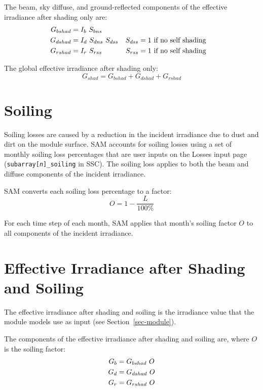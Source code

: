 \documentclass[12pt,letterpaper]{article}
\begin{document}
The beam, sky diffuse, and ground-reflected components of the effective irradiance after shading only are:
\begin{align}
G_{bshad} &= I_b~S_{bns}\notag\\
G_{dshad} &= I_d~S_{dns}~S_{dss} & S_{dss}&=1 ~\text{if no self shading} \notag\\
G_{rshad} &= I_r~S_{rss} & S_{rss}&=1 ~\text{if no self shading}
\end{align}

The global effective irradiance after shading only:
\begin{equation}
G_{shad} = G_{bshad} + G_{dshad} + G_{rshad}
\end{equation}

\section{Soiling}\label{sec-soiling}

Soiling losses are caused by a reduction in the incident irradiance due to dust and dirt on the module surface. SAM accounts for soiling losses using a set of monthly soiling loss percentages that are user inputs on the Losses input page (\texttt{subarray[\textit{n}]\_soiling} in SSC). The soiling loss applies to both the beam and diffuse components of the incident irradiance.

SAM converts each soiling loss percentage to a factor:
\begin{equation}
O=1-\frac{L}{100\%}
\end{equation}

For each time step of each month, SAM applies that month's soiling factor $O$ to all components of the incident irradiance.

\section{Effective Irradiance after Shading and Soiling}

The effective irradiance after shading and soiling is the irradiance value that the module models use as input (see Section~\ref{sec-module}).

The components of the effective irradiance after shading and soiling are, where $O$ is the soiling factor:
\begin{align} \label{eqn-effectivebeamdiffuse}
G_b &= G_{bshad}~O \notag\\
G_d &= G_{dshad}~O\notag\\
G_r &=  G_{rshad}~O
\end{align}
\end{document}

